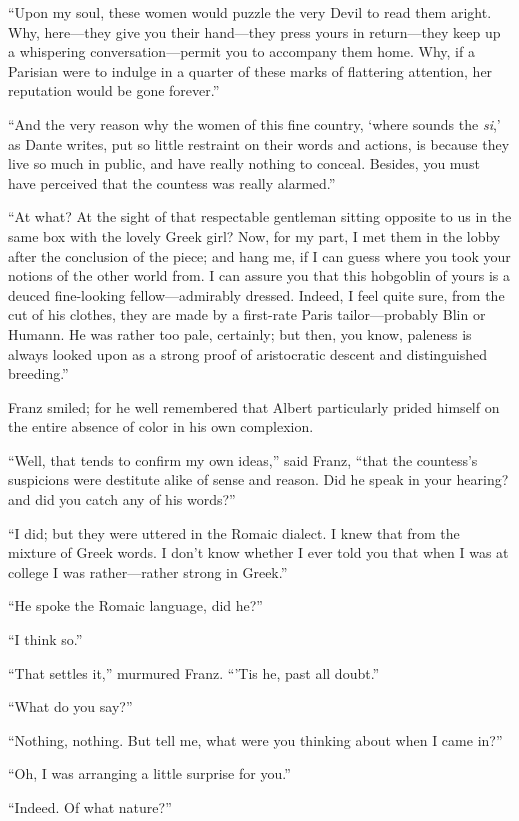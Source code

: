 “Upon my soul, these women would puzzle the very Devil to read them
aright. Why, here—they give you their hand—they press yours in
return—they keep up a whispering conversation—permit you to accompany
them home. Why, if a Parisian were to indulge in a quarter of these
marks of flattering attention, her reputation would be gone forever.”

“And the very reason why the women of this fine country, ‘where sounds
the \textit{si},’ as Dante writes, put so little restraint on their words and
actions, is because they live so much in public, and have really
nothing to conceal. Besides, you must have perceived that the countess
was really alarmed.”

“At what? At the sight of that respectable gentleman sitting opposite
to us in the same box with the lovely Greek girl? Now, for my part, I
met them in the lobby after the conclusion of the piece; and hang me,
if I can guess where you took your notions of the other world from. I
can assure you that this hobgoblin of yours is a deuced fine-looking
fellow—admirably dressed. Indeed, I feel quite sure, from the cut of
his clothes, they are made by a first-rate Paris tailor—probably Blin
or Humann. He was rather too pale, certainly; but then, you know,
paleness is always looked upon as a strong proof of aristocratic
descent and distinguished breeding.”

Franz smiled; for he well remembered that Albert particularly prided
himself on the entire absence of color in his own complexion.

“Well, that tends to confirm my own ideas,” said Franz, “that the
countess’s suspicions were destitute alike of sense and reason. Did he
speak in your hearing? and did you catch any of his words?”

“I did; but they were uttered in the Romaic dialect. I knew that from
the mixture of Greek words. I don’t know whether I ever told you that
when I was at college I was rather—rather strong in Greek.”

“He spoke the Romaic language, did he?”

“I think so.”

“That settles it,” murmured Franz. “’Tis he, past all doubt.”

“What do you say?”

“Nothing, nothing. But tell me, what were you thinking about when I
came in?”

“Oh, I was arranging a little surprise for you.”

“Indeed. Of what nature?”

